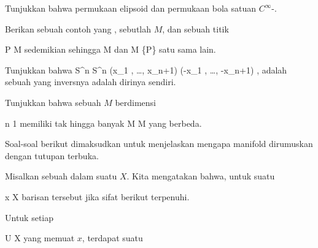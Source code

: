 {}
{

Tunjukkan bahwa permukaan elipsoid dan permukaan bola satuan
$C^\infty$-.

}
{} {}

{}
{

Berikan sebuah contoh
 yang
,
sebutlah $M$, dan sebuah titik

\mavergleichskette
{\vergleichskette
{ P
}
{ \in }{ M
}
{  }{
}
{    }{
}
{   }{
}
}
{}{}{}
sedemikian sehingga
\mathkor {} {M} {dan} {M \setminus \{P\}} {}
satu sama lain.

}
{} {}

{}
{

Tunjukkan bahwa
\maabbeledisp {} {S^n } { S^n
} {(x_1 , \ldots , x_{n+1})} {(-x_1 , \ldots , -x_{n+1})
} {,}
adalah sebuah
 
yang inversnya adalah dirinya sendiri.

}
{} {}

{}
{

Tunjukkan bahwa sebuah
$M$ berdimensi

\mavergleichskette
{\vergleichskette
{ n
}
{ \geq }{ 1
}
{  }{
}
{    }{
}
{   }{
}
}
{}{}{}
memiliki tak hingga banyak
\maabbdisp {\varphi} { M } { M
} {}
yang berbeda.

}
{} {}

Soal-soal berikut dimaksudkan untuk menjelaskan mengapa manifold dirumuskan dengan tutupan terbuka.

Misalkan
 sebuah
dalam suatu
$X$. Kita mengatakan bahwa, untuk suatu

\mavergleichskette
{\vergleichskette
{ x
}
{ \in }{ X
}
{  }{
}
{    }{
}
{   }{
}
}
{}{}{}
barisan tersebut  jika sifat berikut terpenuhi.

Untuk setiap

\mavergleichskette
{\vergleichskette
{ U
}
{ \subseteq }{ X
}
{  }{
}
{    }{
}
{   }{
}
}
{}{}{}
yang memuat $x$, terdapat suatu

